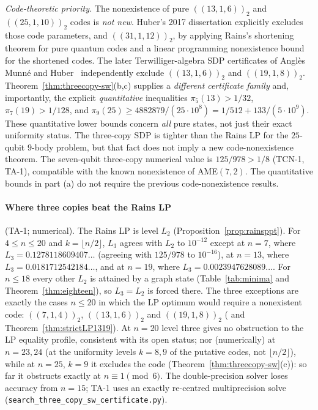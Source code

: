 \noindent\emph{Code-theoretic priority.}
The nonexistence of pure $((13,1,6))_2$ and $((25,1,10))_2$
codes is \emph{not new}. Huber's 2017 dissertation
\cite[\S5.11.4]{HuberThesis17} explicitly excludes those code
parameters, and $((31,1,12))_2$, by applying Rains's
shortening theorem for pure quantum codes and a linear
programming nonexistence bound for the shortened codes.
The later Terwilliger-algebra SDP certificates of
Angl\`es Munn\'e and Huber~\cite{AMH26}
independently exclude $((13,1,6))_2$ and
$((19,1,8))_2$.
Theorem~\ref{thm:threecopy-sw}(b,c) supplies a
\emph{different certificate family} and, importantly, the
explicit \emph{quantitative} inequalities
$\pi_5(13)>1/32$, $\pi_7(19)>1/128$, and
$\pi_9(25)\ge4882879/(25\cdot10^8)
=1/512+133/(5\cdot10^9)$.
These quantitative lower bounds concern \emph{all}
pure states, not just their exact uniformity status.
The three-copy SDP is tighter than the Rains LP for
the $25$-qubit $9$-body problem, but that fact does
not imply a new code-nonexistence theorem.
The seven-qubit three-copy numerical value is
$125/978>1/8$ (TCN-1, TA-1), compatible with the
known nonexistence of AME$(7,2)$.
The quantitative bounds in part (a) do not
require the previous code-nonexistence results.

\paragraph{Where three copies beat the Rains LP} (TA-1; numerical). The Rains LP is level
$L_2$ (Proposition~\ref{prop:rainsppt}). For $4\le n\le20$ and $k=\lfloor n/2\rfloor$, $L_3$ agrees with
$L_2$ to $10^{-12}$ except at $n=7$, where $L_3=0.1278118609407\ldots$ (agreeing with $125/978$ to
$10^{-16}$), at $n=13$, where $L_3=0.0181712542184\ldots$, and at $n=19$, where
$L_3=0.0023947628089\ldots$. For $n\le18$ every other $L_2$ is attained by a graph state
(Table~\ref{tab:minima} and Theorem~\ref{thm:eighteen}), so $L_3=L_2$ is forced there. The three exceptions are exactly the cases
$n\le20$ in which the LP optimum would require a nonexistent code: $((7,1,4))_2$, $((13,1,6))_2$ and
$((19,1,8))_2$ (\cite{HGS} and Theorem~\ref{thm:strictLP1319}). At $n=20$ level three gives no obstruction to the
LP equality profile, consistent with its open status; nor (numerically) at $n=23,24$ (at the uniformity levels $k=8,9$ of the putative codes, not $\lfloor n/2\rfloor$), while at $n=25$, $k=9$
it excludes the code (Theorem~\ref{thm:threecopy-sw}(c)): so far it obstructs exactly at $n\equiv1\pmod6$. The double-precision solver loses accuracy from
$n=15$; TA-1 uses an exactly re-centred multiprecision solve (\texttt{search\_three\_copy\_sw\_certificate.py}).
